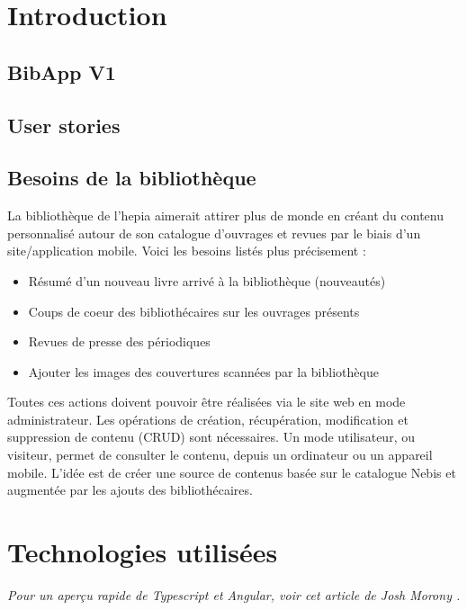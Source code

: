 \documentclass[a4paper, 12pt]{article}
\begin{document}
\newpage

\setcounter{tocdepth}{2}
\tableofcontents
\listoffigures
\renewcommand\listoflistingscaption{Table des listings de code source}
\listoflistings
\newpage

\section{Introduction}
\subsection{BibApp V1}
\subsection{User stories}
\subsection{Besoins de la bibliothèque}
La bibliothèque de l'hepia aimerait attirer plus de monde en créant du contenu personnalisé autour de son
catalogue d'ouvrages et revues par le biais d'un site/application mobile. Voici les besoins listés plus
précisement :
\begin{itemize}
    \item Résumé d'un nouveau livre arrivé à la bibliothèque (nouveautés)
    \item Coups de coeur des bibliothécaires sur les ouvrages présents
    \item Revues de presse des périodiques
    \item Ajouter les images des couvertures scannées par la bibliothèque
\end{itemize}
Toutes ces actions doivent pouvoir être réalisées via le site web en mode administrateur. Les opérations de
création, récupération, modification et suppression de contenu (CRUD) sont nécessaires. Un mode utilisateur, ou visiteur,
permet de consulter le contenu, depuis un ordinateur ou un appareil mobile. L'idée est de créer une source
de contenus basée sur le catalogue Nebis et augmentée par les ajouts des bibliothécaires.

\section{Technologies utilisées}
\textit{Pour un aperçu rapide de Typescript et Angular, voir cet article de Josh Morony \cite{ref30}.}
\end{document}
